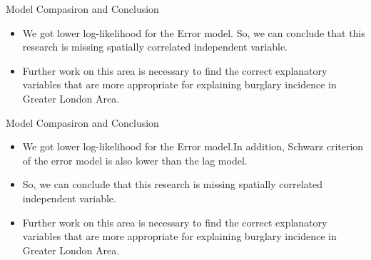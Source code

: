 \documentclass[10pt, aspectratio=169]{beamer}
\begin{document}
\begin{frame}{Model Compasiron and Conclusion}


    \small\begin{table}[!h]
        
        \caption{\label{tab:ml_lag_stats} Statistics of ML\_Lag model.}
    \end{table}

    \small\begin{table}[!h]
        
        \caption{\label{tab:ml_error_stats} Statistics of ML\_Error model.}
    \end{table}

    \begin{itemize}
         
        \item \textbf{}We got lower log-likelihood for the Error model. So, we can conclude that this research is missing spatially correlated independent variable.
        \item \textbf{}Further work on this area is necessary to find the correct explanatory variables that are more appropriate for explaining burglary incidence in Greater London Area.

    \end{itemize}
    
\end{frame}

\begin{frame}{Model Compasiron and Conclusion}

    \begin{itemize}
         
        \item \textbf{}We got lower log-likelihood for the Error model.In addition, Schwarz criterion of the error model is also lower than the lag model.
        \item \textbf{}So, we can conclude that this research is missing spatially correlated independent variable.
        \item \textbf{}Further work on this area is necessary to find the correct explanatory variables that are more appropriate for explaining burglary incidence in Greater London Area.
        
    \end{itemize}
    
\end{frame}
\end{document}
